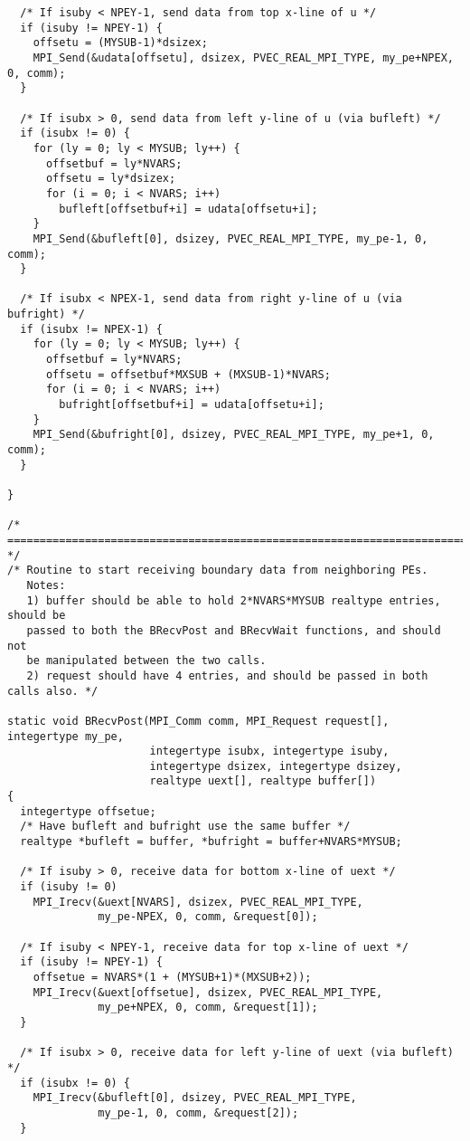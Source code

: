 \begin{verbatim}
  /* If isuby < NPEY-1, send data from top x-line of u */
  if (isuby != NPEY-1) {
    offsetu = (MYSUB-1)*dsizex;
    MPI_Send(&udata[offsetu], dsizex, PVEC_REAL_MPI_TYPE, my_pe+NPEX, 0, comm);
  }

  /* If isubx > 0, send data from left y-line of u (via bufleft) */
  if (isubx != 0) {
    for (ly = 0; ly < MYSUB; ly++) {
      offsetbuf = ly*NVARS;
      offsetu = ly*dsizex;
      for (i = 0; i < NVARS; i++)
        bufleft[offsetbuf+i] = udata[offsetu+i];
    }
    MPI_Send(&bufleft[0], dsizey, PVEC_REAL_MPI_TYPE, my_pe-1, 0, comm);   
  }

  /* If isubx < NPEX-1, send data from right y-line of u (via bufright) */
  if (isubx != NPEX-1) {
    for (ly = 0; ly < MYSUB; ly++) {
      offsetbuf = ly*NVARS;
      offsetu = offsetbuf*MXSUB + (MXSUB-1)*NVARS;
      for (i = 0; i < NVARS; i++)
        bufright[offsetbuf+i] = udata[offsetu+i];
    }
    MPI_Send(&bufright[0], dsizey, PVEC_REAL_MPI_TYPE, my_pe+1, 0, comm);   
  }

}
 
/* ======================================================================= */
/* Routine to start receiving boundary data from neighboring PEs.
   Notes:
   1) buffer should be able to hold 2*NVARS*MYSUB realtype entries, should be
   passed to both the BRecvPost and BRecvWait functions, and should not
   be manipulated between the two calls.
   2) request should have 4 entries, and should be passed in both calls also. */

static void BRecvPost(MPI_Comm comm, MPI_Request request[], integertype my_pe,
                      integertype isubx, integertype isuby,
                      integertype dsizex, integertype dsizey,
                      realtype uext[], realtype buffer[])
{
  integertype offsetue;
  /* Have bufleft and bufright use the same buffer */
  realtype *bufleft = buffer, *bufright = buffer+NVARS*MYSUB;

  /* If isuby > 0, receive data for bottom x-line of uext */
  if (isuby != 0)
    MPI_Irecv(&uext[NVARS], dsizex, PVEC_REAL_MPI_TYPE,
              my_pe-NPEX, 0, comm, &request[0]);

  /* If isuby < NPEY-1, receive data for top x-line of uext */
  if (isuby != NPEY-1) {
    offsetue = NVARS*(1 + (MYSUB+1)*(MXSUB+2));
    MPI_Irecv(&uext[offsetue], dsizex, PVEC_REAL_MPI_TYPE,
              my_pe+NPEX, 0, comm, &request[1]);
  }
  
  /* If isubx > 0, receive data for left y-line of uext (via bufleft) */
  if (isubx != 0) {
    MPI_Irecv(&bufleft[0], dsizey, PVEC_REAL_MPI_TYPE,
              my_pe-1, 0, comm, &request[2]);
  }
  

\end{verbatim}
